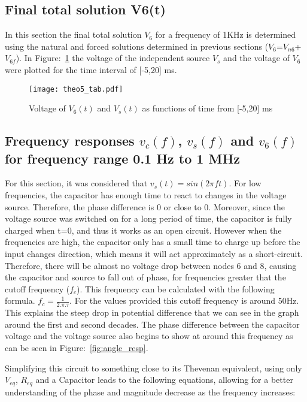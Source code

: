 \pagebreak
\subsection{Final total solution V6(t)}
In this section the final total solution $V_6$ for a frequency of 1KHz is determined using the natural and forced solutions determined in previous sections ($V_6$=$V_{n6}$+$V_{6f}$). In {Figure:~\ref{fig:theo5}} the voltage of the independent source $V_{s}$ and the voltage of $V_{6}$ were plotted for the time interval of [-5,20] ms. 
\begin{figure}[H] \centering
\texttt{[image: theo5\_tab.pdf]}
\caption{Voltage of $V_{6}(t)$ and $V_{s}(t)$ as functions of time from [-5,20] ms}
\label{fig:theo5}
\end{figure}

\subsection{Frequency responses $v_c(f)$, $v_s(f)$ and $v_6(f)$ for frequency range 0.1 Hz to 1 MHz}
\label{ref}
For this section, it was considered that $v_s( t) = sin( 2 \pi f t )$. 
For low frequencies, the capacitor has enough time to react to changes in the voltage source. Therefore, the phase difference is 0 or close to 0. Moreover, since the voltage source was switched on for a long period of time, the capacitor is fully charged when t=0, and thus it works as an open circuit. However when the frequencies are high, the capacitor only has a small time to charge up before the input changes direction, which means it will act approximately as a short-circuit. Therefore, there will be almost no 
voltage drop between nodes 6 and 8, causing the capacitor and source to fall out of phase, for frequencies greater that the cutoff frequency ($f_c$). 
This frequency can be calculated with the following formula. $f_c = \frac{1}{2.\pi.\tau}$.  
For the values provided this cutoff frequency is around 50Hz. This explains the steep drop 
in potential difference that we can see in the graph around the first and second decades.
The phase difference between the capacitor voltage and the voltage source also begins to 
show at around this frequency as can be seen in {Figure:~\ref{fig:angle_resp}}.\par
Simplifying this circuit to something close to its Thevenan equivalent, using only $V_{eq}$, $R_{eq}$ and a Capacitor leads to the following equations, allowing for a better understanding of the phase and magnitude decrease as the frequency increases:

